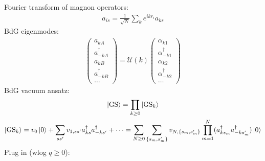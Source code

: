 \documentclass{article}
\begin{document}
\noindent
Fourier transform of magnon operators:
\begin{align}
	a_{is} = \frac{1}{\sqrt N} \sum_{k} e^{ikr_i} a_{ks}
\end{align}
BdG eigenmodes:
\begin{align}
	\begin{pmatrix}
		a_{kA} \\ a_{-kA}^\dagger \\ a_{kB} \\ a_{-kB}^\dagger \\ \dots
	\end{pmatrix} = \mathcal U(k) \begin{pmatrix}
		\alpha_{k1} \\ \alpha_{-k1}^\dagger \\ \alpha_{k2} \\ \alpha_{-k2}^\dagger \\ \dots
	\end{pmatrix}
\end{align}
BdG vacuum ansatz:
\begin{gather}
	\ket{\mathrm{GS}} = \prod_{k\ge 0} \ket{\mathrm{GS}_k} \\
	\ket{\mathrm{GS}_k} = v_0 \ket 0 + \sum_{ss'} v_{1,ss'} a_{ks}^\dagger a_{-ks'}^\dagger + \dots = \sum_{N\ge 0} \sum_{\{s_m,s'_m\}} v_{N,\{s_m,s'_m\}} \prod_{m=1}^N (a_{ks_m}^\dagger a_{-ks'_m}^\dagger) \ket 0 
\end{gather}
Plug in (wlog $q\ge 0$):
\end{document}
